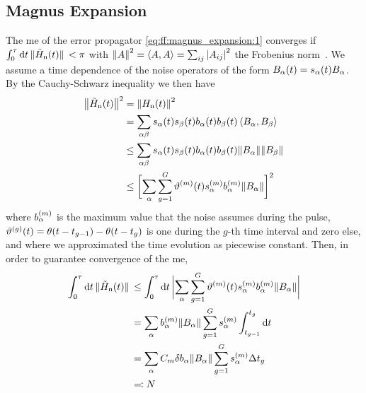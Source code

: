 \subsection{Magnus Expansion}\label{subsec:app:ff:convergence:magnus_expansion}
The \gls{me} of the error propagator \cref{eq:ff:magnus_expansion:1} converges if $\int_0^\tau\dd{t}\norm*{\tilde{H}_{\mathrm{n}}(t)} < \pi$ with $\norm{A}^2 = \expval{A,A} = \sum_{ij}\abs{A_{ij}}^2$ the Frobenius norm~\cite{Moan1999}.
We assume a time dependence of the noise operators of the form $B_\alpha(t) = s_\alpha(t)B_\alpha$.
By the Cauchy-Schwarz inequality we then have
\begin{equation}
    \begin{split}
        \bigl\lVert\tilde{H}_{\mathrm{n}}(t)\bigr\rVert^2 &= \norm{H_{\mathrm{n}}(t)}^2 \\
                          &= \sum_{\alpha\beta} s_\alpha(t) s_{\beta}(t) b_\alpha(t) b_{\beta}(t)\expval{B_\alpha,B_{\beta}} \\
                          &\leq\sum_{\alpha\beta} s_\alpha(t) s_{\beta}(t) b_\alpha(t) b_{\beta}(t)
                             \norm{B_\alpha}\norm{B_{\beta}} \\
                          &\leq\biggl[\sum_{\alpha}\sum_{g=1}^{G}\vartheta^{(m)}(t)
                             s_\alpha^{(m)} b_\alpha^{(m)}\norm{B_\alpha}\biggr]^2
    \end{split}
\end{equation}
where $b_{\alpha}^{(m)}$ is the maximum value that the noise assumes during the pulse, $\vartheta^{(g)}(t) = \theta(t - t_{g-1}) - \theta(t - t_g)$ is one during the $g$-th time interval and zero else, and where we approximated the time evolution as piecewise constant.
Then, in order to guarantee convergence of the \gls{me},
\begin{equation}
    \begin{split}
        \int_0^{\tau}\dd{t}\norm*{\Hnt(t)} &\leq\int_0^\tau\dd{t}\abs\bigg{\sum_{\alpha}\sum_{g=1}^{G}
                                              \vartheta\gth{m}(t) s_\alpha\gth{m} b_\alpha\gth{m}\norm{B_\alpha}} \\
                                           &= \sum_{\alpha} b_\alpha\gth{m}\norm{B_\alpha}\sum_{g=1}^{G}s_\alpha\gth{m}
                                              \int_{t_{g-1}}^{t_{g}}\dd{t} \\
                                           &= \sum_{\alpha} C_m\delta b_\alpha\norm{B_\alpha}\sum_{g=1}^{G}
                                              s_\alpha\gth{m}\Delta t_g \\
                                           &\eqqcolon N
    \end{split}
\end{equation}
